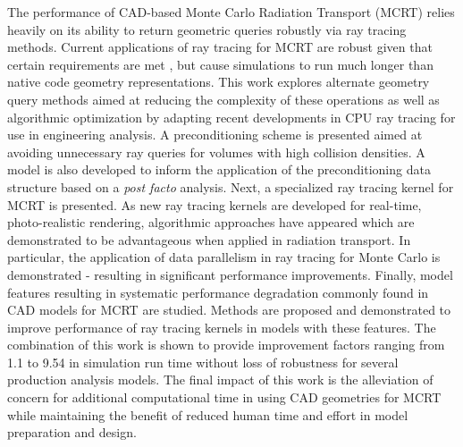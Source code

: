 


The performance of CAD-based Monte Carlo Radiation Transport (MCRT) relies
heavily on its ability to return geometric queries robustly via ray
tracing methods. Current applications of ray tracing for MCRT are robust given that certain
requirements are met \cite{Smith_2011}, but cause simulations to run much longer
than native code geometry representations. This work explores alternate geometry
query methods aimed at reducing the complexity of these operations as well as
algorithmic optimization by adapting recent developments in CPU ray
tracing for use in engineering analysis. A preconditioning scheme is presented
aimed at avoiding unnecessary ray queries for volumes with high collision
densities. A model is also developed to inform the application of the
preconditioning data structure based on a \textit{post facto} analysis. Next, a
specialized ray tracing kernel for MCRT is presented. As new ray tracing kernels
are developed for real-time, photo-realistic rendering, algorithmic approaches
have appeared which are demonstrated to be advantageous when applied in radiation transport. In
particular, the application of data parallelism in ray tracing for Monte Carlo
is demonstrated - resulting in significant performance improvements. Finally,
model features resulting in systematic performance degradation commonly found in
CAD models for MCRT are studied. Methods are proposed and demonstrated to
improve performance of ray tracing kernels in models with these features. The combination
of this work is shown to provide improvement factors ranging from 1.1 to 9.54 in simulation run time
without loss of robustness for several production analysis models. The final impact
of this work is the alleviation of concern for additional computational time in
using CAD geometries for MCRT while maintaining the benefit of reduced human
time and effort in model preparation and design.
